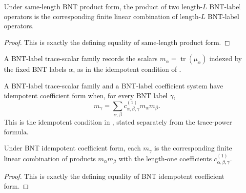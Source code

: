 \begin{theorem}%
    \label{thm:mpdo_bnt_label_same_length_product_eq_sum}
    \leanok
    Under same-length BNT product form, the product of two length-$L$
    BNT-label operators is the corresponding finite linear combination of
    length-$L$ BNT-label operators.
\end{theorem}
\begin{proof}\leanok
    This is exactly the defining equality of same-length product form.
\end{proof}

\begin{definition}%
    \label{def:mpdo_bnt_label_trace_scalar_family}
    \leanok
    A BNT-label trace-scalar family records the scalars
    $m_\alpha=\operatorname{tr}(\mu_\alpha)$ indexed by the fixed BNT labels
    $\alpha$, as in the idempotent condition of \cite[Theorem~4.14(ii)]{Cirac2016MPDO_arXiv}.
\end{definition}

\begin{definition}%
    \label{def:mpdo_bnt_label_idempotent_coefficient_form}
    \leanok
    A BNT-label trace-scalar family and a BNT-label coefficient system have
    idempotent coefficient form when, for every BNT label $\gamma$,
    \[
        m_\gamma =
        \sum_{\alpha,\beta}
        c^{(1)}_{\alpha,\beta,\gamma}m_\alpha m_\beta.
    \]
    This is the idempotent condition in \cite[Theorem~4.14(ii)]{Cirac2016MPDO_arXiv}, stated separately
    from the trace-power formula.
\end{definition}

\begin{theorem}%
    \label{thm:mpdo_bnt_label_idempotent_coefficient_eq_sum}
    \leanok
    Under BNT idempotent coefficient form, each $m_\gamma$ is the
    corresponding finite linear combination of products $m_\alpha m_\beta$
    with the length-one coefficients $c^{(1)}_{\alpha,\beta,\gamma}$.
\end{theorem}
\begin{proof}\leanok
    This is exactly the defining equality of BNT idempotent coefficient form.
\end{proof}

